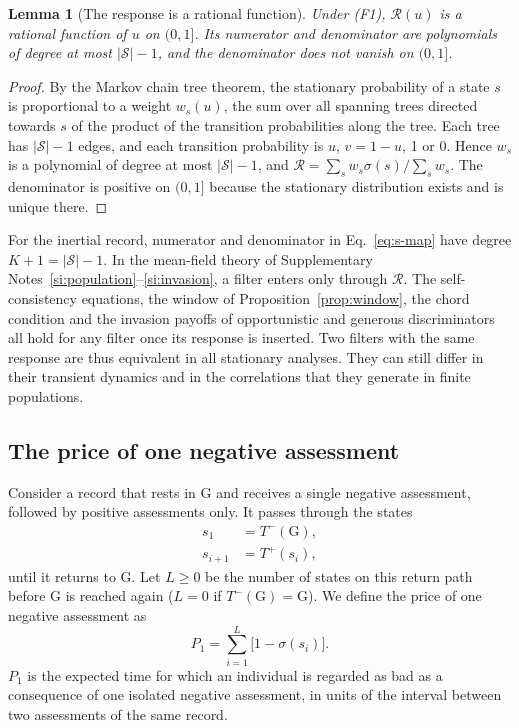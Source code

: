 \documentclass[10pt]{wlscirep}
\newcommand{\Rmap}{\mathscr{R}}            %
\newcommand{\st}[1]{\mathrm{#1}}           %
\newcommand{\Pone}{P_{1}}                  %
\theoremstyle{plain}
\newtheorem{lemma}{Lemma}
\theoremstyle{remark}
\begin{document}
\begin{lemma}[The response is a rational function]\label{lem:rational}
Under (F1), $\Rmap(u)$ is a rational function of $u$ on $(0,1]$. Its numerator and denominator are polynomials of degree at most $|\mathcal S|-1$, and the denominator does not vanish on $(0,1]$.
\end{lemma}
\begin{proof}
By the Markov chain tree theorem, the stationary probability of a state $s$ is proportional to a weight $w_s(u)$, the sum over all spanning trees directed towards $s$ of the product of the transition probabilities along the tree. Each tree has $|\mathcal S|-1$ edges, and each transition probability is $u$, $v=1-u$, 1 or 0. Hence $w_s$ is a polynomial of degree at most $|\mathcal S|-1$, and $\Rmap=\sum_sw_s\sigma(s)/\sum_sw_s$. The denominator is positive on $(0,1]$ because the stationary distribution exists and is unique there.
\end{proof}

For the inertial record, numerator and denominator in Eq.~\eqref{eq:s-map} have degree $K+1=|\mathcal S|-1$. In the mean-field theory of Supplementary Notes~\ref{si:population}--\ref{si:invasion}, a filter enters only through $\Rmap$. The self-consistency equations, the window of Proposition~\ref{prop:window}, the chord condition and the invasion payoffs of opportunistic and generous discriminators all hold for any filter once its response is inserted. Two filters with the same response are thus equivalent in all stationary analyses. They can still differ in their transient dynamics and in the correlations that they generate in finite populations.

\subsection{The price of one negative assessment}

Consider a record that rests in $\st G$ and receives a single negative assessment, followed by positive assessments only. It passes through the states
\begin{equation}
\begin{aligned}
s_1&=T^-(\st G),\\
s_{i+1}&=T^+(s_i),
\end{aligned}
\label{eq:s-return-path}
\end{equation}
until it returns to $\st G$. Let $L\geq0$ be the number of states on this return path before $\st G$ is reached again ($L=0$ if $T^-(\st G)=\st G$). We define the price of one negative assessment as
\begin{equation}
\Pone=\sum_{i=1}^{L}\bigl[1-\sigma(s_i)\bigr].
\label{eq:s-price}
\end{equation}
$\Pone$ is the expected time for which an individual is regarded as bad as a consequence of one isolated negative assessment, in units of the interval between two assessments of the same record.
\end{document}
